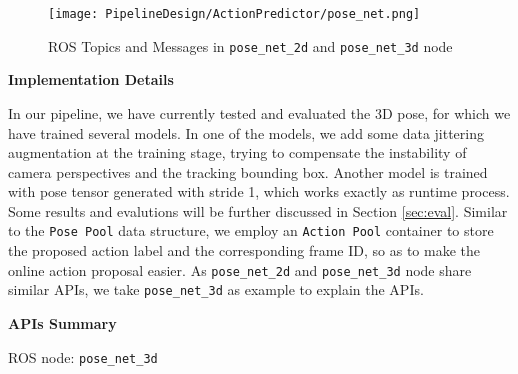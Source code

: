 \begin{figure}[h!]
  \centering
  \texttt{[image: PipelineDesign/ActionPredictor/pose\_net.png]}
  \caption{ROS Topics and Messages in \texttt{pose\_net\_2d} and \texttt{pose\_net\_3d} node}  
  \label{fig:pose_net}
\end{figure}   

\textbf{Implementation Details} 

In our pipeline, we have currently tested and evaluated the 3D pose, for which we have trained several models. In one of the models, we add some data jittering augmentation at the training stage, trying to compensate the instability of camera perspectives and the tracking bounding box. Another model is trained with pose tensor generated with stride 1, which works exactly as runtime process. Some results and evalutions will be further discussed in Section \ref{sec:eval}. Similar to the \texttt{Pose Pool} data structure, we employ an \texttt{Action Pool} container to store the proposed action label and the corresponding frame ID, so as to make the online action proposal easier. As \texttt{pose\_net\_2d} and \texttt{pose\_net\_3d} node share similar APIs, we take \texttt{pose\_net\_3d} as example to explain the APIs. 

\textbf{APIs Summary}

ROS node: \texttt{pose\_net\_3d}

